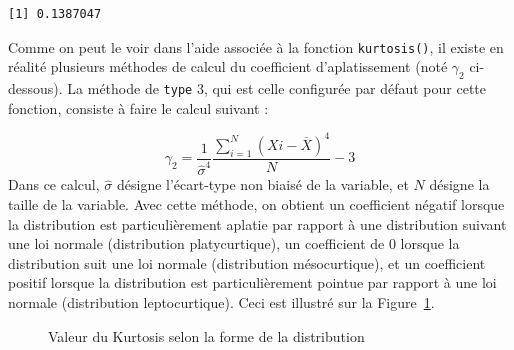 \documentclass[
  letterpaper,
]{book}
\newenvironment{Shaded}{\begin{snugshade}}{\end{snugshade}}
\newcommand{\AttributeTok}[1]{\textcolor[rgb]{0.40,0.45,0.13}{#1}}
\newcommand{\DecValTok}[1]{\textcolor[rgb]{0.68,0.00,0.00}{#1}}
\newcommand{\FunctionTok}[1]{\textcolor[rgb]{0.28,0.35,0.67}{#1}}
\newcommand{\NormalTok}[1]{\textcolor[rgb]{0.00,0.23,0.31}{#1}}
\newcommand{\SpecialCharTok}[1]{\textcolor[rgb]{0.37,0.37,0.37}{#1}}
\begin{document}
\begin{Shaded}
\end{Shaded}

\begin{verbatim}
[1] 0.1387047
\end{verbatim}

Comme on peut le voir dans l'aide associée à la fonction
\texttt{kurtosis()}, il existe en réalité plusieurs méthodes de calcul
du coefficient d'aplatissement (noté \(\gamma_{2}\) ci-dessous). La
méthode de \texttt{type} 3, qui est celle configurée par défaut pour
cette fonction, consiste à faire le calcul suivant :

\[\gamma_{2} =  \frac{1}{\hat{\sigma}^4} {\frac{\sum_{i=1}^{N} (X{i} - \overline{X})^4}{N}} -3\]
Dans ce calcul, \(\hat{\sigma}\) désigne l'écart-type non biaisé de la
variable, et \(N\) désigne la taille de la variable. Avec cette méthode,
on obtient un coefficient négatif lorsque la distribution est
particulièrement aplatie par rapport à une distribution suivant une loi
normale (distribution platycurtique), un coefficient de 0 lorsque la
distribution suit une loi normale (distribution mésocurtique), et un
coefficient positif lorsque la distribution est particulièrement pointue
par rapport à une loi normale (distribution leptocurtique). Ceci est
illustré sur la Figure~\ref{fig-kurtosisdistri}.

\begin{figure}


\caption{\label{fig-kurtosisdistri}Valeur du Kurtosis selon la forme de
la distribution}

\end{figure}%
\end{document}
